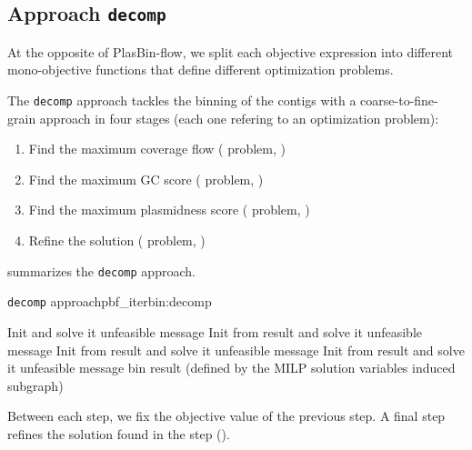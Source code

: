 \subsection{Approach \texttt{decomp}}\label{sec:pbf_iterbin:decomp}

\begin{newfeatbox}
  At the opposite of PlasBin-flow, we split each objective expression into different mono-objective functions that define different optimization problems.
\end{newfeatbox}
The \texttt{decomp} approach tackles the binning of the contigs with a coarse-to-fine-grain approach in four stages (each one refering to an optimization problem):

\begin{enumerate}[label=\roman*.]
  \item Find the maximum coverage flow (\MCF{} problem, )
  \item Find the maximum GC score (\MGC{} problem, )
  \item Find the maximum plasmidness score (\MPS{} problem, )
  \item Refine the solution (\MRCF{} problem, )
\end{enumerate}

 summarizes the \texttt{decomp} approach.

\begin{tcbalgo}{\texttt{decomp} approach}{pbf_iterbin:decomp}
  \begin{algorithmic}[1]
    \State{} Init \MCF{} and solve it
    \State{} \Return{}unfeasible message
    \EndIf{}
    \State{} Init \MGC{} from \MCF{} result and solve it
    \State{} \Return{}unfeasible message
    \EndIf{}
    \State{} Init \MPS{} from \MGC{} result and solve it
    \State{} \Return{}unfeasible message
    \EndIf{}
    \State{} Init \MRCF{} from \MPS{} result and solve it
    \State{} \Return{}unfeasible message
    \EndIf{}
    \State{} \Return{}\MRCF{} bin result (defined by the MILP solution variables induced subgraph)
    \EndFunction{}
  \end{algorithmic}
\end{tcbalgo}

Between each step, we fix the objective value of the previous step.
A final step refines the solution found in the \MPS{} step ().




